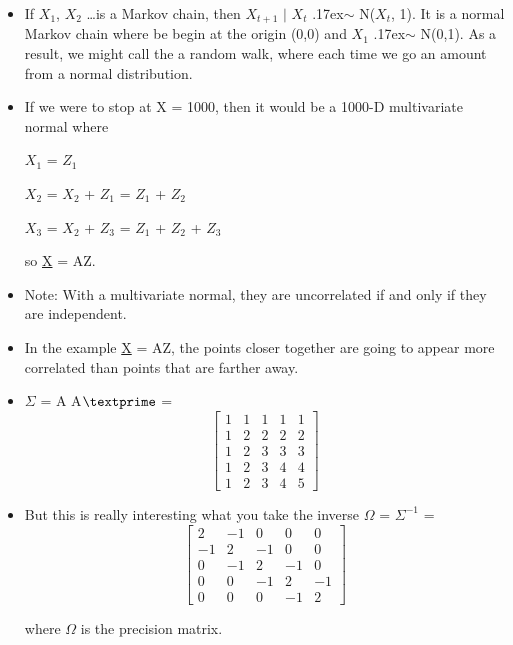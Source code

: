 \documentclass[12pt]{report}
\begin{document}
\begin{itemize}

\item If $X_{1}$, $X_{2}$ \ldots is a Markov chain, then $X_{t+1}$ $\mid$ $X_{t}$ {\raise.17ex\hbox{$\scriptstyle\sim$}} N($X_{t}$, 1). It is a normal Markov chain where be begin at the origin (0,0) and $X_{1}$ {\raise.17ex\hbox{$\scriptstyle\sim$}} N(0,1). As a result, we might call the a random walk, where each time we go an amount from a normal distribution. 

\item If we were to stop at X = 1000, then it would be a 1000-D multivariate normal where 

\bigskip
$X_{1}$  = $Z_{1}$ 

$X_{2}$  = $X_{2}$  + $Z_{1}$ = $Z_{1}$  + $Z_{2}$

 $X_{3}$  = $X_{2}$  + $Z_{3}$ = $Z_{1}$  + $Z_{2}$ + $Z_{3}$
 
 \bigskip
 so \underline{X} = AZ.

\item Note: With a multivariate normal, they are uncorrelated if and only if they are independent.

\item In the example \underline{X} = AZ, the points closer together are going to appear more correlated than points that are farther away. 

\item $\Sigma$ = A A$\textprime$ =  \[  \begin{bmatrix}
    1 & 1 & 1 & 1 & 1  \\
    1 & 2 & 2 & 2 & 2 \\
    1 & 2 & 3 & 3 & 3 \\
    1 & 2 & 3 & 4 & 4 \\
    1 & 2 & 3 & 4 & 5
  \end{bmatrix}
	\] 

\item But this is really interesting what you take the inverse $\Omega$ = $\Sigma^{-1}$ =  \[  \begin{bmatrix}
    2 & -1 & 0 & 0 & 0  \\
    -1 & 2 & -1 & 0 & 0 \\
    0 & -1 & 2 & -1 & 0 \\
    0 & 0 & -1 & 2 & -1 \\
    0 & 0 & 0 & -1  & 2
  \end{bmatrix}
	\] 

where $\Omega$ is the precision matrix.


\end{itemize}
\end{document}
